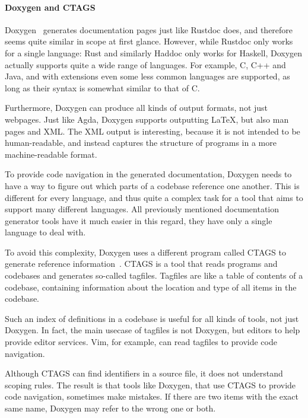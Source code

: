 
\paragraph{Doxygen and CTAGS}

Doxygen~\autocite{doxygen} generates documentation pages just like Rustdoc does, and therefore seems quite similar in scope at first glance.
However, while Rustdoc only works for a single language: Rust and similarly Haddoc only works for Haskell, Doxygen actually supports quite a wide range of languages.
For example, C, C++ and Java, and with extensions even some less common languages are supported, as long as their syntax is somewhat similar to that of C.

Furthermore, Doxygen can produce all kinds of output formats, not just webpages.
Just like Agda, Doxygen supports outputting LaTeX, but also man pages and \acs{XML}.
The \ac{XML} output is interesting, because it is not intended to be human-readable, and instead captures the structure of programs in a more machine-readable format.

To provide code navigation in the generated documentation, Doxygen needs to have a way to figure out which parts of a codebase reference one another.
This is different for every language, and thus quite a complex task for a tool that aims to support many different languages.
All previously mentioned documentation generator tools have it much easier in this regard, they have only a single language to deal with.

To avoid this complexity, Doxygen uses a different program called CTAGS to generate reference information~\autocite{ctags}.
CTAGS is a tool that reads programs and codebases and generates so-called tagfiles.
Tagfiles are like a table of contents of a codebase, containing information about the location and type of all items in the codebase.

Such an index of definitions in a codebase is useful for all kinds of tools, not just Doxygen.
In fact, the main usecase of tagfiles is not Doxygen, but editors to help provide editor services.
Vim, for example, can read tagfiles to provide code navigation.

Although CTAGS can find identifiers in a source file, it does not understand scoping rules.
The result is that tools like Doxygen, that use CTAGS to provide code navigation, sometimes make mistakes.
If there are two items with the exact same name, Doxygen may refer to the wrong one or both.

